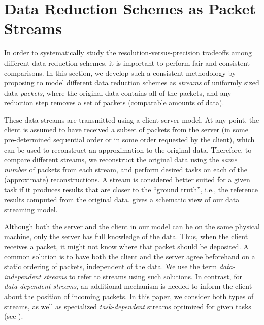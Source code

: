 \section{Data Reduction Schemes as Packet Streams}\label{sec:terminologies}

In order to systematically study the resolution-versus-precision tradeoffs among different data
reduction schemes, it is important to perform fair and consistent comparisons.  In this section, we
develop such a consistent methodology by proposing to model different data reduction schemes as
\emph{streams} of uniformly sized data \emph{packets}, where the original data contains all of the
packets, and any reduction step removes a set of packets (comparable amounts of data).

These data streams are transmitted using a client-server model. At any point, the client is assumed
to have received a subset of packets from the server (in some pre-determined sequential order or 
in some order requested by the client), which can be used to reconstruct an
approximation to the original data. Therefore, to compare different streams, we reconstruct the
original data using the \emph{same number} of packets from each stream, and perform desired tasks on
each of the (approximate) reconstructions. A stream is considered better suited for a given task if
it produces results that are closer to the ``ground truth'', i.e., the reference results computed
from the original data.  gives a schematic view of our data streaming model.

Although both the server and the client in our model can be on the same physical machine, only the
server has full knowledge of the data. Thus, when the client receives a packet, it might not know
where that packet should be deposited. A common solution is to have both the client and the server
agree beforehand on a static ordering of packets, independent of the data. We use the term
\emph{data-independent streams} to refer to streams using such solutions. In contrast, for
\emph{data-dependent streams}, an additional mechanism is needed to inform the client about the
position of incoming packets.  In this paper, we consider both types of streams, as well as
specialized \emph{task-dependent} streams optimized for given tasks (see ).

